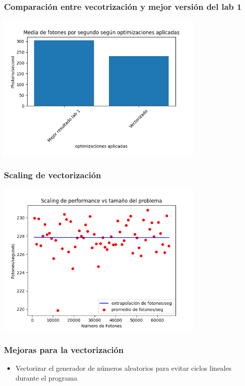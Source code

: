 \documentclass{beamer}
\begin{document}
\begin{frame}
    \frametitle{Comparación entre vecotrización y mejor versión del lab 1}
    \includegraphics[width=4in]{imagenes/comparacion_optim_vector.png}
\end{frame}

\begin{frame}
    \frametitle{Scaling de vectorización}
    \includegraphics[width=4in]{imagenes/scaling_vec.png}
\end{frame}

\begin{frame}
    \frametitle{Mejoras para la vectorización}
    \begin{itemize}
        \item Vectorizar el generador de números aleatorios para evitar ciclos lineales durante el programa
    \end{itemize}
\end{frame}
\end{document}
